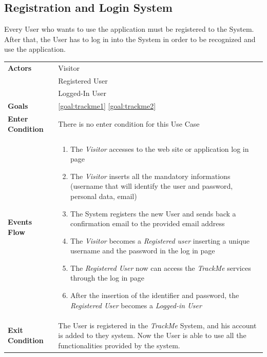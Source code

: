   \subsection{Registration and Login System}
Every User who wants to use the application must be registered to the System.
After that, the User has to log in into the System in order to be recognized and use the application.

\begin{table}[H]
	\centering
    
    \begin{tabular}{|p{3.5cm}|p{10.3cm}|}
    
    \hline
    \textbf{\large{Actors}}  			& \tabitem Visitor\\
    				 					& \tabitem Registered User\\
                     					& \tabitem Logged-In User\\
    \hline
    \textbf{\large{Goals}} 				& \ref{goal:trackme1}                                                     \ref{goal:trackme2}\\
    
    \hline
    \textbf{\large{Enter Condition}}	& There is no enter condition for this Use Case		\\
    
    \hline
    \textbf{\large{Events Flow}}		& \begin{enumerate}[leftmargin=0.5cm]
                                          	\item The \emph{Visitor}  accesses to the web site or application log in page
                                            \item The \emph{Visitor} inserts all the mandatory informations (username that will identify the user and password, personal data, email)
                                            \item The System registers the new User and sends back a confirmation email to the provided email address
                                            \item The \emph{Visitor} becomes a \emph{Registered user} inserting a unique username and the password in the log in page   
                                            \item The \emph{Registered User} now can access the \emph{TrackMe} services through the log in page
                                            \item After the insertion of the identifier and password, the \emph{Registered User} becomes a \emph{Logged-in User}
                                          \end{enumerate}
    										\\
    \hline
    \textbf{\large{Exit Condition}} 	& The User is registered in the \emph{TrackMe} System, and his account is added to they system. Now the User is able to use all the functionalities provided by the system. \\
    

\end{tabular}
\end{table}
